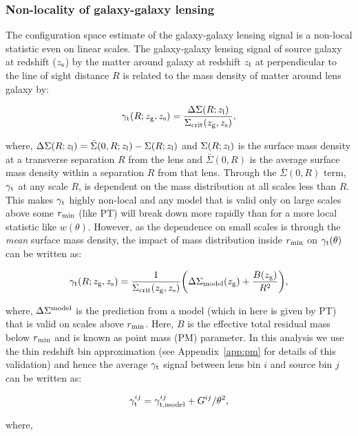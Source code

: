 \documentclass[fleqn,usenatbib]{mnras}
\newcommand{\gammat}{\ensuremath{\gamma_{\rm t}(\theta)}}
\newcommand{\wtheta}{\ensuremath{w(\theta)}}
\begin{document}
\subsubsection{Non-locality of galaxy-galaxy lensing}  \label{sec:pm_theory}
The configuration space estimate of the galaxy-galaxy lensing signal is a
non-local statistic even on linear scales. The galaxy-galaxy lensing
signal of source galaxy at redshift ($z_{\rm s}$) by the matter around
galaxy at redshift $z_{\rm l}$ at perpendicular to the line of sight
distance $R$ is related to the mass density of matter around lens
galaxy by:
\begin{linenomath*}
\begin{equation}
    \gamma_{\rm t}(R;z_{\rm g},z_{\rm s}) = \frac{\Delta \Sigma (R;z_{\rm l})}{\Sigma_{\rm crit} (z_{\rm g},z_{\rm s})},
\end{equation}
\end{linenomath*}
where, $\Delta \Sigma(R;z_{\rm l}) = \bar{\Sigma}(0,R; z_{\rm l}) - \Sigma(R;z_{\rm l})$ and $\Sigma(R;z_{\rm l})$ is the surface mass density at a transverse separation $R$ from the lens and $\bar{\Sigma}(0,R)$ is the average surface mass density within a separation $R$ from that lens. Through the $\bar{\Sigma}(0,R)$ term, $\gamma_{\rm t}$  at any scale $R$, is dependent on the mass distribution at all scales less than $R$. This makes $\gamma_{\rm t}$  highly non-local and any model that is valid only on large scales above some $r_{\rm min}$ (like PT) will break down more rapidly than for a more local statistic like \wtheta. However, as the dependence on small scales is through the \textit{mean} surface mass density, the impact of mass distribution inside $r_{\rm min}$ on $\gammat$ can be written as:
\begin{linenomath*}
\begin{equation}
    \gamma_{\rm t}(R;z_{\rm g},z_{\rm s}) = \frac{1}{\Sigma_{\rm crit}(z_{\rm g},z_{\rm s})} \bigg(\Delta \Sigma_{\rm model}(z_{\rm g}) + \frac{B(z_{\rm g})}{R^2} \bigg),
\end{equation}
\end{linenomath*}
where, $\Delta \Sigma^{\rm model}$ is the prediction from a model (which in here is given by PT) that is valid on scales above $r_{\rm min}$. Here, $B$ is the effective total residual mass below $r_{\rm min}$ and is known as point mass (PM) parameter. In this analysis we use the thin redshift bin approximation (see Appendix~\ref{app:pm} for details of this validation) and hence the average $\gamma_{\rm t}$ signal between lens bin $i$ and source bin $j$ can be written as:
\begin{linenomath*}
\begin{equation}
    \gamma^{ij}_{{\rm t}} = \gamma^{ij}_{{\rm t, model}} + G^{ij}/\theta^2,
\end{equation}
\end{linenomath*}
where,
\end{document}
